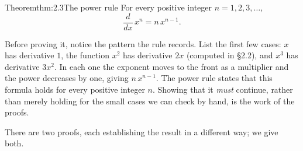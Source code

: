 \documentclass[a4paper,12pt,oneside]{memoir}
\begin{document}
\begin{envtheorem}{Theorem}{thm:2.3}{The power rule}
For every positive integer \(n = 1, 2, 3, \ldots\), \[ \frac{d}{dx}\,x^{n} = n\,x^{n-1}. \]
\end{envtheorem}
Before proving it, notice the pattern the rule records. List the first few cases: \(x\) has derivative \(1\), the function \(x^{2}\) has derivative \(2x\) (computed in §2.2), and \(x^{3}\) has derivative \(3x^{2}\). In each one the exponent moves to the front as a multiplier and the power decreases by one, giving \(n\,x^{n-1}\). The power rule states that this formula holds for every positive integer \(n\). Showing that it \emph{must} continue, rather than merely holding for the small cases we can check by hand, is the work of the proofs.

There are two proofs, each establishing the result in a different way; we give both.
\end{document}
